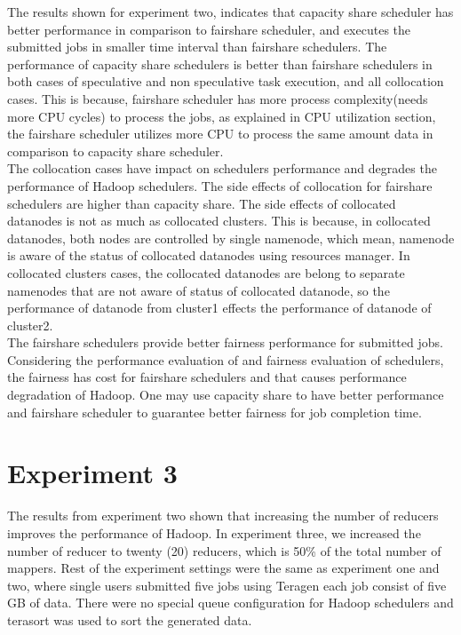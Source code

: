 The results shown for experiment two, indicates that capacity share scheduler has better performance in comparison to fairshare scheduler, and executes the submitted jobs in smaller time interval than fairshare schedulers. The performance of capacity share schedulers is better than fairshare schedulers in both cases of speculative and non speculative task execution, and all collocation cases. This is because, fairshare scheduler has more process complexity(needs more CPU cycles) to process the jobs, as explained in CPU utilization section, the fairshare scheduler utilizes more CPU to process the same amount data in comparison to capacity share scheduler.  \\

The collocation cases have impact on schedulers performance and degrades the performance of Hadoop schedulers. The side effects of collocation for fairshare schedulers are higher than capacity share. The side effects of collocated datanodes is not as much as collocated clusters. This is because, in collocated datanodes, both nodes are controlled by single namenode, which mean, namenode is aware of the status of collocated datanodes using resources manager. In collocated clusters cases, the collocated datanodes are belong to separate namenodes that are not aware of status of collocated datanode, so the performance of datanode from cluster1 effects the performance of datanode of cluster2.\\  
 

 The fairshare schedulers provide better fairness performance for submitted jobs. Considering the performance evaluation of and fairness evaluation of schedulers, the fairness has cost for fairshare schedulers and that causes performance degradation of Hadoop. One may use capacity share to have better performance and fairshare scheduler to guarantee better fairness for job completion time.\\




\section{Experiment 3}

The results from experiment two shown that increasing the number of reducers improves the performance of Hadoop. In experiment three, we increased the number of reducer to twenty (20) reducers, which is 50\% of the total number of mappers. Rest of the experiment settings were the same as experiment one and two, where single users submitted five jobs using Teragen each job consist of five GB of data. There were no special queue configuration for Hadoop schedulers and terasort was used to sort the generated data. 
  
